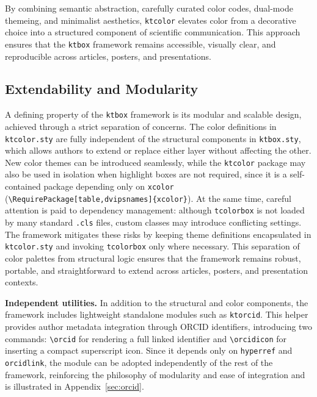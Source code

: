 \documentclass[12pt,onecolumn]{article}
\begin{document}
  By combining semantic abstraction, carefully curated color codes, dual-mode themeing, and minimalist aesthetics, \texttt{ktcolor} elevates color from a decorative choice into a structured component of scientific communication. This approach ensures that the \texttt{ktbox} framework remains accessible, visually clear, and reproducible across articles, posters, and presentations.

\subsection{Extendability and Modularity}
\label{sec:extendability-and-modularity}
  A defining property of the \texttt{ktbox} framework is its modular and scalable design, achieved through a strict separation of concerns. The color definitions in \texttt{ktcolor.sty} are fully independent of the structural components in \texttt{ktbox.sty}, which allows authors to extend or replace either layer without affecting the other. New color themes can be introduced seamlessly, while the \texttt{ktcolor} package may also be used in isolation when highlight boxes are not required, since it is a self-contained package depending only on \texttt{xcolor} (\verb|\RequirePackage[table,dvipsnames]{xcolor}|). At the same time, careful attention is paid to dependency management: although \texttt{tcolorbox} is not loaded by many standard \texttt{.cls} files, custom classes may introduce conflicting settings. The framework mitigates these risks by keeping theme definitions encapsulated in \texttt{ktcolor.sty} and invoking \texttt{tcolorbox} only where necessary. This separation of color palettes from structural logic ensures that the framework remains robust, portable, and straightforward to extend across articles, posters, and presentation contexts.

  \textbf{Independent utilities.} In addition to the structural and color components, the framework includes lightweight standalone modules such as \texttt{ktorcid}. This helper provides author metadata integration through ORCID identifiers, introducing two commands: \verb|\orcid| for rendering a full linked identifier and \verb|\orcidicon| for inserting a compact superscript icon. Since it depends only on \texttt{hyperref} and \texttt{orcidlink}, the module can be adopted independently of the rest of the framework, reinforcing the philosophy of modularity and ease of integration and is illustrated in Appendix~\ref{sec:orcid}.

  
\end{document}
